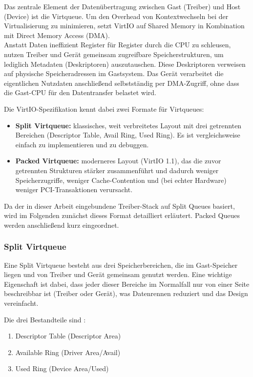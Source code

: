 Das zentrale Element der Datenübertragung zwischen Gast (Treiber) und Host (Device) ist die Virtqueue. Um den Overhead von Kontextwechseln bei der Virtualisierung zu minimieren, setzt VirtIO auf Shared Memory in Kombination mit Direct Memory Access (DMA).\\
Anstatt Daten ineffizient Register für Register durch die CPU zu schleusen, nutzen Treiber und Gerät gemeinsam zugreifbare Speicherstrukturen, um lediglich Metadaten (Deskriptoren) auszutauschen. Diese Deskriptoren verweisen auf physische Speicheradressen im Gastsystem. Das Gerät verarbeitet die eigentlichen Nutzdaten anschließend selbstständig per DMA-Zugriff, ohne dass die Gast-CPU für den Datentransfer belastet wird.

Die VirtIO-Spezifikation kennt dabei zwei Formate für Virtqueues:

\begin{itemize}
 \item \textbf{Split Virtqueue:} klassisches, weit verbreitetes Layout mit drei getrennten Bereichen (Descriptor Table, Avail Ring, Used Ring). Es ist vergleichsweise einfach zu implementieren und zu debuggen.
 \item \textbf{Packed Virtqueue:} moderneres Layout (VirtIO 1.1), das die zuvor getrennten Strukturen stärker zusammenführt und dadurch weniger Speicherzugriffe, weniger Cache-Contention und (bei echter Hardware) weniger PCI-Transaktionen verursacht.
\end{itemize}

Da der in dieser Arbeit eingebundene Treiber-Stack auf Split Queues basiert, wird im Folgenden zunächst dieses Format detailliert erläutert. Packed Queues werden anschließend kurz eingeordnet.

\subsubsection{Split Virtqueue}

Eine Split Virtqueue besteht aus drei Speicherbereichen, die im Gast-Speicher liegen und von Treiber und Gerät gemeinsam genutzt werden. Eine wichtige Eigenschaft ist dabei, dass jeder dieser Bereiche im Normalfall nur von einer Seite beschreibbar ist (Treiber oder Gerät), was Datenrennen reduziert und das Design vereinfacht.

Die drei Bestandteile sind \cite{OASISVirtio12}:

\begin{enumerate}
 \item Descriptor Table (Descriptor Area)
 \item Available Ring (Driver Area/Avail)
 \item Used Ring (Device Area/Used)
\end{enumerate}

